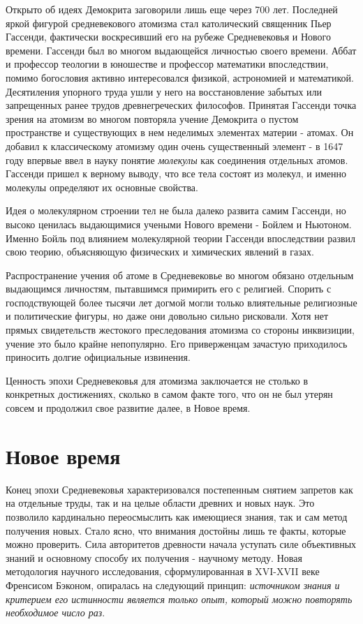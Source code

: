 Открыто об идеях Демокрита заговорили лишь еще через 700 лет.
Последней яркой фигурой средневекового атомизма стал католический священник Пьер Гассенди, фактически воскресивший его на рубеже Средневековья и Нового времени.
Гассенди был во многом выдающейся личностью своего времени. 
Аббат и профессор теологии в юношестве и профессор математики впоследствии, помимо богословия активно интересовался физикой, астрономией и математикой. 
Десятиления упорного труда ушли у него на восстановление забытых или запрещенных ранее трудов древнегреческих философов. 
Принятая Гассенди точка зрения на атомизм во многом повторяла учение Демокрита о пустом пространстве и существующих в нем неделимых элементах материи - атомах. 
Он добавил к классическому атомизму один очень существенный элемент - в 1647 году впервые ввел в науку понятие \textit{молекулы} как соединения отдельных атомов. 
Гассенди пришел к верному выводу, что все тела состоят из молекул, и именно молекулы определяют их основные свойства.

Идея о молекулярном строении тел не была далеко развита самим Гассенди, но высоко ценилась выдающимися учеными Нового времени - Бойлем и Ньютоном.
Именно Бойль под влиянием молекулярной теории Гассенди впоследствии развил свою теорию, объясняющую физических и химических явлений в газах.    

Распространение учения об атоме в Средневековье во многом обязано отдельным выдающимся личностям, пытавшимся примирить его с религией.
Спорить с господствующей более тысячи лет догмой могли только влиятельные религиозные и политические фигуры, но даже они довольно сильно рисковали.
Хотя нет прямых свидетельств жестокого преследования атомизма со стороны инквизиции, учение это было крайне непопулярно.
Его приверженцам зачастую приходилось приносить долгие официальные извинения.

Ценность эпохи Средневековья для атомизма заключается не столько в конкретных достижениях, сколько в самом факте того, что он не был утерян совсем и продолжил свое развитие далее, в Новое время.


\section*{Новое время}

Конец эпохи Средневековья характеризовался постепенным снятием запретов как на отдельные труды, так и на целые области древних и новых наук. 
Это позволило кардинально переосмыслить как имеющиеся знания, так и сам метод получения новых.
Стало ясно, что внимания достойны лишь те факты, которые можно проверить.
Сила авторитетов древности начала уступать силе объективных знаний и основному способу их получения - научному методу.
Новая методология научного исследования, сформулированная в XVI-XVII веке Френсисом Бэконом, опиралась на следующий принцип: \textit{источником знания и критерием его истинности является только опыт, который можно повторять необходимое число раз}.

